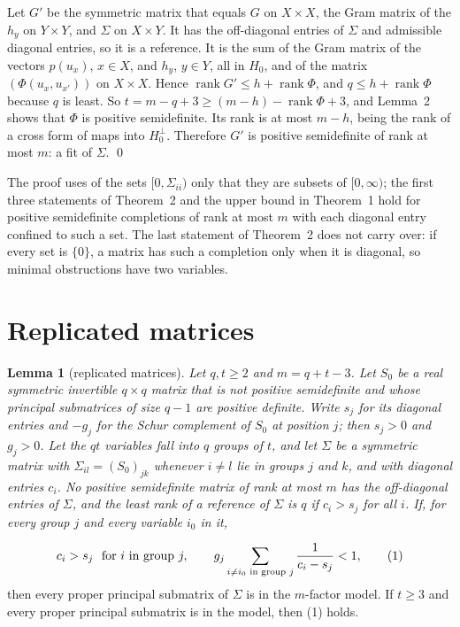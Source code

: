 \documentclass[11pt,letterpaper,reqno]{amsart}
\theoremstyle{spaced}
\newtheorem{lemma}{Lemma}
\begin{document}
Let \(G'\) be the symmetric matrix that equals \(G\) on \(X \times X\), the Gram matrix of the \(h_y\) on \(Y \times Y\), and \(\Sigma\) on \(X \times Y\). It has the off-diagonal entries of \(\Sigma\) and admissible diagonal entries, so it is a reference. It is the sum of the Gram matrix of the vectors \(p(u_x)\), \(x \in X\), and \(h_y\), \(y \in Y\), all in \(H_0\), and of the matrix \((\Phi(u_x, u_{x'}))\) on \(X \times X\). Hence \(\operatorname{rank} G' \le h + \operatorname{rank} \Phi\), and \(q \le h + \operatorname{rank} \Phi\) because \(q\) is least. So \(t = m - q + 3 \ge (m - h) - \operatorname{rank} \Phi + 3\), and Lemma~2 shows that \(\Phi\) is positive semidefinite. Its rank is at most \(m - h\), being the rank of a cross form of maps into \(H_0^{\perp}\). Therefore \(G'\) is positive semidefinite of rank at most \(m\): a fit of \(\Sigma\). \qed

The proof uses of the sets \([0, \Sigma_{ii})\) only that they are subsets of \([0, \infty)\); the first three statements of Theorem~2 and the upper bound in Theorem~1 hold for positive semidefinite completions of rank at most \(m\) with each diagonal entry confined to such a set. The last statement of Theorem~2 does not carry over: if every set is \(\{0\}\), a matrix has such a completion only when it is diagonal, so minimal obstructions have two variables.

\hypertarget{replicated-matrices}{%
\section{Replicated matrices}\label{replicated-matrices}}

\begin{lemma}[replicated matrices]
Let \(q, t \ge 2\) and \(m = q + t - 3\). Let \(S_0\) be a real symmetric invertible \(q \times q\) matrix that is not positive semidefinite and whose principal submatrices of size \(q-1\) are positive definite. Write \(s_j\) for its diagonal entries and \(-g_j\) for the Schur complement of \(S_0\) at position \(j\); then \(s_j > 0\) and \(g_j > 0\). Let the \(qt\) variables fall into \(q\) groups of \(t\), and let \(\Sigma\) be a symmetric matrix with \(\Sigma_{il} = (S_0)_{jk}\) whenever \(i \ne l\) lie in groups \(j\) and \(k\), and with diagonal entries \(c_i\). No positive semidefinite matrix of rank at most \(m\) has the off-diagonal entries of \(\Sigma\), and the least rank of a reference of \(\Sigma\) is \(q\) if \(c_i > s_j\) for all \(i\). If, for every group \(j\) and every variable \(i_0\) in it,
\end{lemma}
\[c_i > s_j \ \text{ for } i \text{ in group } j, \qquad g_j \sum_{i \ne i_0 \text{ in group } j} \frac{1}{c_i - s_j} < 1, \tag{1}\postdisplaypenalty=10000 \]
then every proper principal submatrix of \(\Sigma\) is in the \(m\)-factor model. If \(t \ge 3\) and every proper principal submatrix is in the model, then (1) holds.
\end{document}
